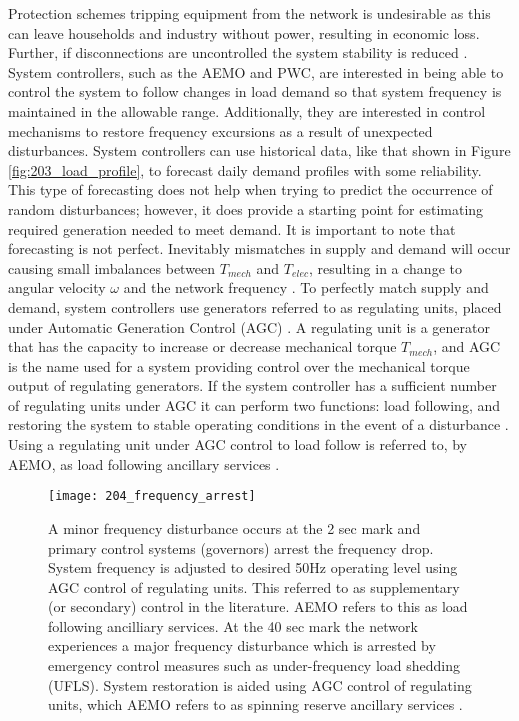 Protection schemes tripping equipment from the network is undesirable as this can leave households and industry without power, resulting in economic loss. Further, if disconnections are uncontrolled the system stability is reduced \cite{AEMOpowerfreqriskrev}. System controllers, such as the AEMO and PWC, are interested in being able to control the system to follow changes in load demand so that system frequency is maintained in the allowable range. Additionally, they are interested in control mechanisms to restore frequency excursions as a result of unexpected disturbances. System controllers can use historical data, like that shown in Figure \ref{fig:203_load_profile}, to forecast daily demand profiles with some reliability. This type of forecasting does not help when trying to predict the occurrence of random disturbances; however, it does provide a starting point for estimating required generation needed to meet demand. It is important to note that forecasting is not perfect. Inevitably mismatches in supply and demand will occur causing small imbalances between $T_{mech}$ and $T_{elec}$, resulting in a change to angular velocity $\omega$ and the network frequency \cite{Glover2012}. To perfectly match supply and demand, system controllers use generators referred to as regulating units, placed under Automatic Generation Control (AGC) \cite{Kothari2011}. A regulating unit is a generator that has the capacity to increase or decrease mechanical torque $T_{mech}$, and AGC is the name used for a system providing control over the mechanical torque output of regulating generators. If the system controller has a sufficient number of regulating units under AGC it can perform two functions: load following, and restoring the system to stable operating conditions in the event of a disturbance \cite{Grainger1994}. Using a regulating unit under AGC control to load follow is referred to, by AEMO, as load following ancillary services \cite{AEMOancilliaryserv}.

\begin{figure}[ht]
\centering
\texttt{[image: 204\_frequency\_arrest]}
\caption[Frequency profiles of differing disturbance types]{A minor frequency disturbance occurs at the 2 sec mark and primary control systems (governors) arrest the frequency drop. System frequency is adjusted to desired 50$\si{\hertz}$ operating level using AGC control of regulating units. This referred to as supplementary (or secondary) control in the literature. AEMO refers to this as load following ancilliary services. At the 40 sec mark the network experiences a major frequency disturbance which is arrested by emergency control measures such as under-frequency load shedding (UFLS). System restoration is aided using AGC control of regulating units, which AEMO refers to as spinning reserve ancillary services \cite{Bevrani2011}.}
\label{fig:204_frequency_arrest}
\end{figure}

